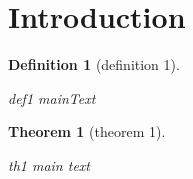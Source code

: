 \documentclass{article}
\newcommand{\depends}[1]{}
\newcommand{\summary}[1]{}
\newcommand{\mainText}[1]{#1}
\newtheorem{theorem}{Theorem}
\newtheorem{definition}{Definition}
\begin{document}
\section{Introduction}
\label{sec:intro}

\begin{definition}[definition 1]
    \label{def:def1}
    \summary{def1 summary}
    \mainText{def1 mainText}
\end{definition}

\begin{theorem}[theorem 1]
    \label{th:th1}
    \depends{def:def1}
    \summary{th1 summary}
    \mainText{th1 main text}
\end{theorem}
\end{document}
